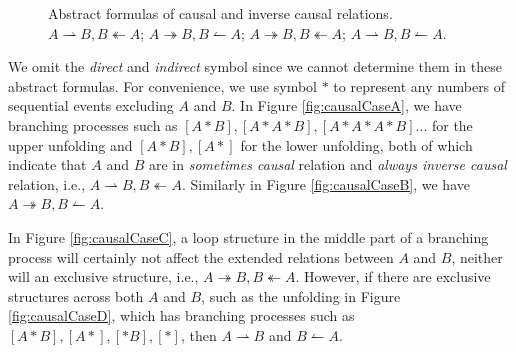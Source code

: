 \documentclass{llncs}
\begin{document}
\begin{figure}[htbp]
{\begin{minipage}[b]{0.45\textwidth}
	\end{minipage}
	\label{fig:causalCaseB}
}
\caption{Abstract formulas of causal and inverse causal relations.  $A\rightharpoonup B, B\twoheadleftarrow A$;  $A\twoheadrightarrow B, B\leftharpoonup A$;  $A\twoheadrightarrow B, B\twoheadleftarrow A$;  $A\rightharpoonup B, B\leftharpoonup A$.\label{fig:causalCases}}
\end{figure}

We omit the \textit{direct} and \textit{indirect} symbol since we cannot determine them in these abstract formulas. For convenience, we use symbol $*$ to represent any numbers of sequential events excluding $A$ and $B$. In Figure \ref{fig:causalCaseA}, we have branching processes such as $[A*B],[A*A*B],[A*A*A*B]...$ for the upper unfolding and $[A*B],[A*]$ for the lower unfolding, both of which indicate that $A$ and $B$ are in \textit{sometimes causal} relation and \textit{always inverse causal} relation, i.e., $A\rightharpoonup B,B\twoheadleftarrow A$. Similarly in Figure \ref{fig:causalCaseB}, we have $A\twoheadrightarrow B,B\leftharpoonup A$.

In Figure \ref{fig:causalCaseC}, a loop structure in the middle part of a branching process will certainly not affect the extended relations between $A$ and $B$, neither will an exclusive structure, i.e., $A\twoheadrightarrow B,B\twoheadleftarrow A$. However, if there are exclusive structures across both $A$ and $B$, such as the unfolding in Figure \ref{fig:causalCaseD}, which has branching processes such as $[A*B],[A*],[*B],[*]$, then $A\rightharpoonup B$ and $B\leftharpoonup A$.
\end{document}

